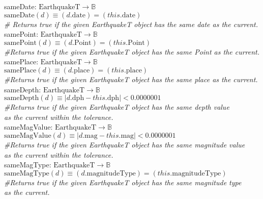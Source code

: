 \documentclass[12pt]{article}
\begin{document}
\noindent sameDate: $\mbox{EarthquakeT} \rightarrow \mathbb{B}$\\
$\mbox{sameDate}(d) \equiv (d.\mbox{date}) = (this.\mbox{date})$\\
\noindent \textit{\# Returns true if the given EarthquakeT object has the same date as the current.}\\

\noindent samePoint: $\mbox{EarthquakeT} \rightarrow \mathbb{B}$\\
$\mbox{samePoint}(d) \equiv (d.\mbox{Point}) = (this.\mbox{Point})$\\
\noindent \textit{\#Returns true if the given EarthquakeT object has the same Point as the current.}\\

\noindent samePlace: $\mbox{EarthquakeT} \rightarrow \mathbb{B}$\\
$\mbox{samePlace}(d) \equiv (d.\mbox{place}) = (this.\mbox{place})$\\
\noindent \textit{\#Returns true if the given EarthquakeT object has the same place as the current.}\\

\noindent sameDepth: $\mbox{EarthquakeT} \rightarrow \mathbb{B}$\\
$\mbox{sameDepth}(d) \equiv |d.\mbox{dph} - this.\mbox{dph}| < 0.0000001$\\
\noindent \textit{\#Returns true if the given EarthquakeT object has the same depth value\\
 as the current within the tolerance.}\\

\noindent sameMagValue: $\mbox{EarthquakeT} \rightarrow \mathbb{B}$\\
$\mbox{sameMagValue}(d) \equiv |d.\mbox{mag} - this.\mbox{mag}| < 0.0000001$\\
\noindent \textit{\#Returns true if the given EarthquakeT object has the same magnitude value\\
 as the current within the tolerance.}\\

\noindent sameMagType: $\mbox{EarthquakeT} \rightarrow \mathbb{B}$\\
$\mbox{sameMagType}(d) \equiv (d.\mbox{magnitudeType}) = (this.\mbox{magnitudeType})$\\
\noindent \textit{\#Returns true if the given EarthquakeT object has the same magnitude type\\
 as the current.}\\
\end{document}
